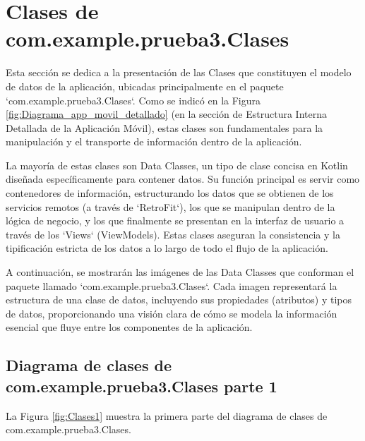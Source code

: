 \section{Clases de com.example.prueba3.Clases}

Esta sección se dedica a la presentación de las Clases que constituyen el modelo de datos de la aplicación, ubicadas principalmente en el paquete `com.example.prueba3.Clases`. Como se indicó en la Figura \ref{fig:Diagrama_app_movil_detallado} (en la sección de Estructura Interna Detallada de la Aplicación Móvil), estas clases son fundamentales para la manipulación y el transporte de información dentro de la aplicación.

La mayoría de estas clases son Data Classes, un tipo de clase concisa en Kotlin diseñada específicamente para contener datos. Su función principal es servir como contenedores de información, estructurando los datos que se obtienen de los servicios remotos (a través de `RetroFit`), los que se manipulan dentro de la lógica de negocio, y los que finalmente se presentan en la interfaz de usuario a través de los `Views` (ViewModels). Estas clases aseguran la consistencia y la tipificación estricta de los datos a lo largo de todo el flujo de la aplicación.

A continuación, se mostrarán las imágenes de las Data Classes que conforman el paquete llamado `com.example.prueba3.Clases`. Cada imagen representará la estructura de una clase de datos, incluyendo sus propiedades (atributos) y tipos de datos, proporcionando una visión clara de cómo se modela la información esencial que fluye entre los componentes de la aplicación.

\newpage

\subsection{Diagrama de clases de com.example.prueba3.Clases parte 1}

La Figura \ref{fig:Clases1} muestra la primera parte del diagrama de clases de com.example.prueba3.Clases.


